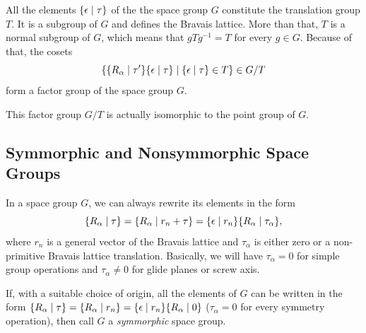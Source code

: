 All the elements $\{ \epsilon \mid \tau \}$ of the the space group $G$ constitute the translation group $T$. It is a subgroup of $G$ and defines the Bravais lattice. More than that, $T$ is a normal subgroup of $G$, which means that $g T g^{-1} = T$ for every $g \in G$. Because of that, the cosets
$$
\{ \{ R_\alpha \mid \tau' \} \{ \epsilon \mid \tau \} \mid \{ \epsilon \mid \tau \} \in T \} \in G/T
$$
form a factor group of the space group $G$.

This factor group $G/T$ is actually isomorphic to the point group of $G$.

\subsection{Symmorphic and Nonsymmorphic Space Groups}

In a space group $G$, we can always rewrite its elements in the form
$$
\{ R_\alpha \mid \tau \} = \{ R_\alpha \mid r_n + \tau \} = \{ \epsilon \mid r_n \} \{ R_\alpha \mid \tau_\alpha \},
$$
where $r_n$ is a general vector of the Bravais lattice and $\tau_\alpha$ is either zero or a non-primitive Bravais lattice translation. Basically, we will have $\tau_\alpha = 0$ for simple group operations and $\tau_\alpha \neq 0$ for glide planes or screw axis.

If, with a suitable choice of origin, all the elements of $G$ can be written in the form $\{ R_\alpha \mid \tau \} = \{ R_\alpha \mid r_n \} = \{ \epsilon \mid r_n \} \{ R_\alpha \mid 0 \}$ ($\tau_\alpha = 0$ for every symmetry operation), then call $G$ a \textit{symmorphic} space group.



